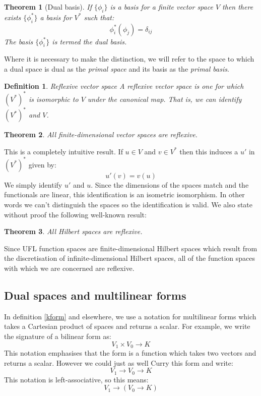 \documentclass[a4paper,11pt]{article}
\newtheorem{theorem}{Theorem}[section]
\newtheorem{definition}{Definition}[section]
\begin{document}
\begin{theorem}[Dual basis]
If $\{\phi_i\}$ is a basis for a finite vector space $V$ then there exists $\{\phi_i^*\}$ a basis for $V^*$ such that:
\begin{equation} 
    \phi_i^*(\phi_j) = \delta_{ij}
\end{equation} 
The basis $\{\phi_i^*\}$ is termed the \emph{dual basis}.
\end{theorem}
Where it is necessary to make the distinction, we will refer to the space to which a dual space is dual as the \emph{primal space} and its basis as the \emph{primal basis}. 
\begin{definition}{Reflexive vector space}
    A reflexive vector space is one for which $(V^{*})^{*}$ is isomorphic to $V$ under the canonical map. That is, we can identify $(V^*)^*$ and $V$.
\end{definition}
\begin{theorem}
    All finite-dimensional vector spaces are reflexive.
\end{theorem}
This is a completely intuitive result. If $u\in V$ and $v\in V^*$ then this induces a $u'$ in $(V^*)^*$ given by:
\begin{equation}
    u'(v) = v(u)    
\end{equation}
We simply identify $u'$ and $u$. Since the dimensions of the spaces match and the functionals are linear, this identification is an isometric isomorphism. In other words we can't distinguish the spaces so the identification is valid. We also state without proof the following well-known result:

\begin{theorem}
    All Hilbert spaces are reflexive.
\end{theorem}

Since UFL function spaces are finite-dimensional Hilbert spaces which result from the discretisation of infinite-dimensional Hilbert spaces, all of the function spaces with which we are concerned are reflexive.

\subsection{Dual spaces and multilinear forms}

In definition \ref{kform} and elsewhere, we use a notation for multilinear forms which takes a Cartesian product of spaces and returns a scalar. For example, we write the signature of a bilinear form as:
\begin{equation}
    V_1 \times V_0 \rightarrow K
\end{equation} 
This notation emphasises that the form is a function which takes two vectors and returns a scalar. However we could just as well Curry this form and write:
\begin{equation}  
    V_1 \rightarrow V_0 \rightarrow K
\end{equation} 
This notation is left-associative, so this means:
\begin{equation} 
    V_1 \rightarrow (V_0 \rightarrow K)
\end{equation} 
\end{document}
